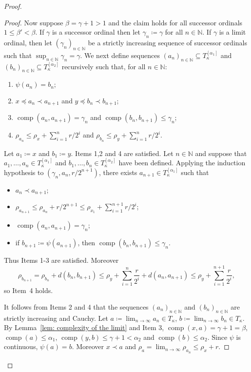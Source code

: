 \documentclass[11pt]{article}
\DeclareMathOperator{\comp}{comp}
\theoremstyle{definition}
\theoremstyle{remark}
\begin{document}
\begin{proof}
\begin{proof}
    	Now suppose $\beta = \gamma + 1> 1$ and the claim holds for all successor ordinals $1 \leq \beta' < \beta$. If $\gamma$ is a successor ordinal then let $\gamma_n \coloneqq \gamma$ for all $n \in \mathbb{N}$. If $\gamma$ is a limit ordinal, then let $(\gamma_n)_{n \in \mathbb{N}}$ be a strictly increasing sequence of successor ordinals such that $\sup_{n \in \mathbb{N}} \gamma_n = \gamma$.  We next define sequences $(a_n)_{n \in \mathbb{N}} \subseteq T_\kappa^{[\alpha_1]}$ and $(b_n)_{n \in \mathbb{N}} \subseteq T_\kappa^{[\alpha_2]}$ recursively such that, for all $n \in \mathbb{N}$:
    	\begin{enumerate}
    		\item $\psi(a_n) = b_n$;
    		\item $x \preceq a_n \prec a_{n+1}$ and $y \preceq b_n \prec b_{n+1}$;
    		\item $\comp(a_n,a_{n+1}) = \gamma_{n}$ and $\comp(b_n,b_{n+1}) \leq \gamma_{n}$;
    		\item $\rho_{a_n} \leq \rho_{x} + \sum_{i=1}^n r/2^i$ and $\rho_{b_n} \leq \rho_{y} + \sum_{i=1}^n r/2^i$.
    	\end{enumerate}
    	Let $a_1 \coloneqq x$ and $b_1 \coloneqq y$. Items 1,2 and 4 are satisfied. Let $n \in \mathbb{N}$ and suppose that $a_1, \dots, a_n \in T_\kappa^{[\alpha_1]}$ and $b_1, \dots, b_n \in T_\kappa^{[\alpha_2]}$ have been defined. Applying the induction hypothesis to $(\gamma_{n}, a_n, r/2^{n+1})$, there exists $a_{n+1} \in T_\kappa^{[\alpha_1]}$ such that 
    	\begin{itemize} 
    		\item[i.] $a_n \prec a_{n+1}$;
    		\item[ii.] $\rho_{a_{n+1}} \leq \rho_{a_n} + r/2^{n+1} \leq \rho_{x_1} + \sum_{i=1}^{n+1} r/2^i$;
    		\item[iii.] $\comp(a_n, a_{n+1}) = \gamma_{n}$;
    		\item[iv.] if $b_{n+1} \coloneqq \psi(a_{n+1})$, then $\comp(b_n, b_{n+1}) \leq \gamma_{n}$.
    	\end{itemize}
    	Thus Items 1-3 are satisfied. Moreover 
    	\[
    	\rho_{b_{n+1}} = \rho_{b_n} + d(b_n, b_{n+1}) \leq \rho_{y} + \sum_{i=1}^n \frac{r}{2^i} + d(a_n, a_{n+1}) \leq \rho_{y} + \sum_{i=1}^{n+1} \frac{r}{2^i},
    	\]
    	so Item~4 holds.
    	
    	It follows from Items 2 and 4 that the sequences $(a_n)_{n \in \mathbb{N}}$ and $(b_n)_{n \in \mathbb{N}}$ are strictly increasing and Cauchy. Let $a \coloneqq \lim_{n \rightarrow \infty} a_n \in T_\kappa$, $b \coloneqq \lim_{n \rightarrow \infty} b_n \in T_\kappa$. By Lemma~\ref{lem: complexity of the limit} and Item 3, $\comp(x,a) = \gamma + 1 = \beta$, $\comp(a) \leq \alpha_1$, $\comp(y,b) \leq \gamma + 1 < \alpha_2$ and $\comp(b) \leq \alpha_2$. Since $\psi$ is continuous, $\psi(a) = b$.
    	Moreover $x \prec a$ and $\rho_{a} = \lim_{n \rightarrow \infty} \rho_{a_n} \leq \rho_{x} + r$.
    \end{proof}


\end{proof}
\end{document}
